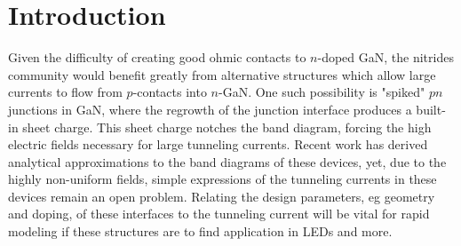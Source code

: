 \section{Introduction}
Given the difficulty of creating good ohmic contacts to $n$-doped GaN, the nitrides community would benefit greatly from alternative structures which allow large currents to flow from $p$-contacts into $n$-GaN.  One such possibility is "spiked" $pn$ junctions in GaN, where the regrowth of the junction interface produces a built-in sheet charge.  This sheet charge notches the band diagram, forcing the high electric fields necessary for large tunneling currents.  Recent work has derived analytical approximations to the band diagrams of these devices, yet, due to the highly non-uniform fields, simple expressions of the tunneling currents in these devices remain an open problem.  Relating the design parameters, eg geometry and doping, of these interfaces to the tunneling current will be vital for rapid modeling if these structures are to find application in LEDs and more.
